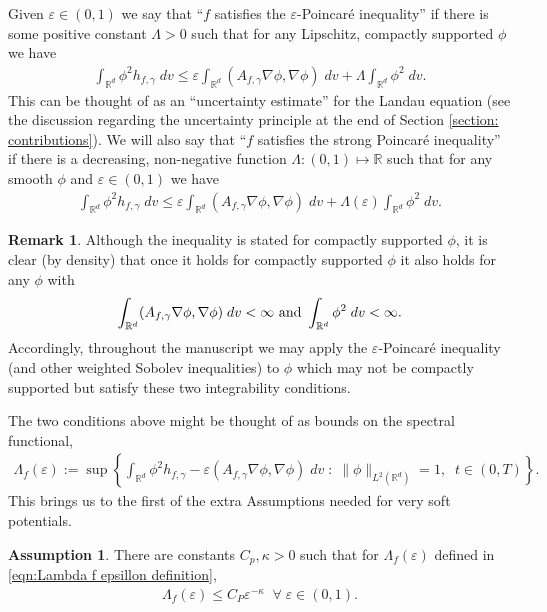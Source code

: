 \documentclass[12pt,american]{amsart}
\numberwithin{equation}{section}
\theoremstyle{plain}
\theoremstyle{definition}                  %
\newtheorem{rem}[thm]{Remark}
\newtheorem{Assumption}{Assumption}
\def\Lamp{\Lambda(\varepsilon)}
\def\Lampf{\Lambda_f(\varepsilon)}
\begin{document}
Given $\varepsilon \in (0,1)$ we say that ``$f$ satisfies the $\varepsilon$-Poincar\'e inequality'' if there is some positive constant $\Lambda>0$ such that for any Lipschitz, compactly supported $\phi$ we have
\begin{align*}
  \int_{\mathbb{R}^d} \phi^2 h_{f,\gamma}\;dv \leq \varepsilon \int_{\mathbb{R}^d} (A_{f,\gamma} \nabla\phi,\nabla\phi)\;dv + \Lambda\int_{\mathbb{R}^d} \phi^2\;dv.
\end{align*}
This can be thought of as an ``uncertainty estimate'' for the Landau equation (see the discussion regarding the uncertainty principle at the end of Section \ref{section: contributions}). We will also say that ``$f$ satisfies the strong Poincar\'e inequality'' if there is a decreasing, non-negative function $\Lambda:(0,1)\mapsto \mathbb{R}$ such that for any smooth $\phi$ and $\varepsilon \in (0,1)$ we have
\begin{align*}
  \int_{\mathbb{R}^d} \phi^2 h_{f,\gamma}\;dv \leq \varepsilon \int_{\mathbb{R}^d} (A_{f,\gamma}\nabla\phi,\nabla\phi)\;dv + \Lamp \int_{\mathbb{R}^d}\phi^2\;dv.
\end{align*}
\begin{rem}\label{rem:compactness of supports and inequalities}
  Although the inequality is stated for compactly supported $\phi$, it is clear (by density) that once it holds for compactly supported $\phi$ it also holds for any $\phi$ with
  \begin{align*}
    \int_{\mathbb{R}^d} (A_{f,\gamma} \nabla\phi,\nabla\phi)\;dv<\infty \textnormal{ and } \int_{\mathbb{R}^d} \phi^2\;dv<\infty.  
  \end{align*}	  
  Accordingly, throughout the manuscript we may apply the $\varepsilon$-Poincar\'e inequality (and other weighted Sobolev inequalities) to $\phi$ which may not be compactly supported but satisfy these two integrability conditions. 
\end{rem}

The two conditions above might be thought of as bounds on the spectral functional,
\begin{align}\label{eqn:Lambda f epsillon definition}
  \Lampf := \sup \left \{ \int_{\mathbb{R}^d}\phi^2 h_{f,\gamma} - \varepsilon( A_{f,\gamma}\nabla \phi,\nabla \phi)\;dv \;:\; \|\phi\|_{L^2(\mathbb{R}^d)} = 1,\;\; t\in (0,T) \right \}.
\end{align}
This brings us to the first of the extra Assumptions needed for very soft potentials.
\begin{Assumption}\label{Assumption:Epsilon Poincare}
  There are constants $C_p,\kappa>0$ such that for $\Lampf$ defined in \eqref{eqn:Lambda f epsillon definition},
  \begin{align}\label{eqn:Spectral Assumption on f}
    \Lampf \leq C_P\varepsilon^{-\kappa}\;\; \forall\;\varepsilon\in (0,1).
  \end{align}
\end{Assumption}
\end{document}

